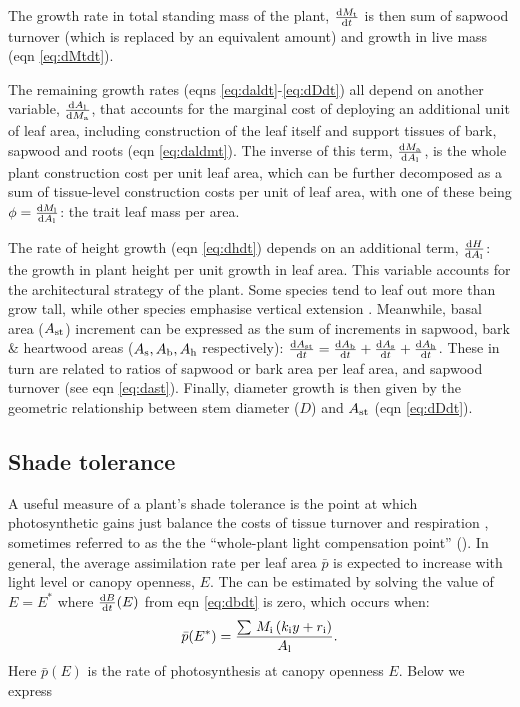 \documentclass[a4paper,11pt]{article}
\begin{document}
The growth rate in total standing mass of the plant, $\frac{{\rm d}M_{{\rm t}}}{{\rm d}t}$ is then sum of sapwood turnover (which is replaced by an equivalent amount) and growth in live mass (eqn \ref{eq:dMtdt}).

The remaining growth rates (eqns \ref{eq:daldt}-\ref{eq:dDdt}) all depend on another variable, $\frac{{\rm d}A_{\rm l}} {{\rm d}M_{\rm a}}$, that accounts for the marginal cost of deploying an additional unit of leaf area, including construction of the leaf itself and support tissues of bark, sapwood and roots (eqn \ref{eq:daldmt}). The inverse of this term, $\frac{{\rm d}M_{\rm a} }{{\rm d}A_{\rm l}}$, is the whole plant construction cost per unit leaf area, which can be further decomposed as a sum of tissue-level construction costs per unit of leaf area, with one of these being $\phi = \frac{{\rm d}M_{\rm l} }{{\rm d}A_{\rm l}}$: the trait leaf mass per area.

The rate of height growth (eqn \ref{eq:dhdt}) depends on an additional term, $\frac{{\rm d}H }{{\rm d}A_{\rm l}}$: the growth in plant height per unit growth in leaf area. This variable accounts for the architectural strategy of the plant. Some species tend to leaf out more than grow tall, while other species emphasise vertical extension \citep{Poorter-2006}. Meanwhile, basal area ($A_{\rm st}$) increment can be expressed as the sum of increments in sapwood, bark \& heartwood areas ($A_{\rm s}, A_{\rm b}, A_{\rm h}$ respectively): $\frac{{\rm d}A_{\rm st}}{{\rm d}t}= \frac{{\rm d}A_{\rm b}}{{\rm d}t} + \frac{{\rm d}A_{\rm s}}{{\rm d}t} + \frac{{\rm d}A_{\rm h}}{{\rm d}t}$. These in turn are related to ratios of sapwood or bark area per leaf area, and sapwood turnover (see eqn \ref{eq:dast}). Finally, diameter growth is then given by the geometric relationship between stem diameter ($D$) and $A_{\rm st}$ (eqn \ref{eq:dDdt}).

\subsection{Shade tolerance}
A useful measure of a plant's shade tolerance is the point at which photosynthetic gains just balance the costs of tissue turnover and respiration \citep{Givnish-1988,Baltzer-2007,Lusk-2013}, sometimes referred to as the the ``whole-plant light compensation point'' (\wplcp{}).  In general, the average assimilation rate per leaf area $\bar{p}$ is expected to increase with light level or canopy openness, $E$. The \wplcp can be estimated by solving the value of $E=E^*$ where $\frac{{\rm d}B} {{\rm d}t}(E)$ from eqn \ref{eq:dbdt} is zero, which occurs when:
\begin{equation}\label{eq:wplcp}
\bar{p}(E^*) =\frac{\sum \, M_{\rm i} \left(k_{\rm i} y + r_{\rm i}\right)}{A_{\rm l}}.
\end{equation}
Here $\bar{p}(E)$ is the rate of photosynthesis at canopy openness $E$. Below we express
\end{document}
